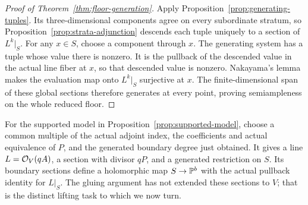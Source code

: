 \begin{proof}[Proof of Theorem~\ref{thm:floor-generation}]
Apply Proposition~\ref{prop:generating-tuples}.  Its three-dimensional
components agree on every subordinate stratum, so
Proposition~\ref{prop:strata-adjunction} descends each tuple uniquely to
a section of \(L^k|_S\).  For any \(x\in S\), choose a component through
\(x\).  The generating system has a tuple whose value there is nonzero.
It is the pullback of the descended value in the actual line fiber at
\(x\), so that descended value is nonzero.  Nakayama's lemma makes the
evaluation map onto \(L^k|_S\) surjective at \(x\).  The finite-dimensional
span of these global sections therefore generates at every point, proving
semiampleness on the whole reduced floor.
\end{proof}

For the supported model in Proposition~\ref{prop:supported-model}, choose
a common multiple of the actual adjoint index, the coefficients and actual
equivalence of \(P\), and the generated boundary degree just obtained.
It gives a line \(L=\mathcal O_V(qA)\), a section with divisor \(qP\), and a
generated restriction on \(S\).  Its boundary sections define a holomorphic
map \(S\to\mathbb P^b\) with the actual pullback identity for \(L|_S\).
The gluing argument has not extended these sections to \(V\); that is
the distinct lifting task to which we now turn.
